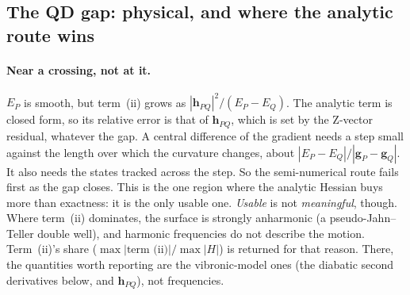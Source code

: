\documentclass[11pt]{article}
\begin{document}
\subsection{The QD gap: physical, and where the analytic route wins}

\paragraph{Near a crossing, not at it.} $E_P$ is smooth, but term~(ii)
grows as $|\mathbf h_{PQ}|^2/(E_P - E_Q)$. The analytic term is closed
form, so its relative error is that of $\mathbf h_{PQ}$, which is set by
the Z-vector residual, whatever the gap. A central difference of the
gradient needs a step small against the length over which the
curvature changes, about $|E_P - E_Q|/|\mathbf g_P - \mathbf g_Q|$. It
also needs the states tracked across the step. So the semi-numerical
route fails first as the gap closes. This is the one region where the
analytic Hessian buys more than exactness: it is the only usable one.
\emph{Usable} is not \emph{meaningful}, though. Where term~(ii) dominates,
the surface is strongly anharmonic (a pseudo-Jahn--Teller double well),
and harmonic frequencies do not describe the motion. Term~(ii)'s share
($\max|\text{term (ii)}|/\max|H|$) is returned for that reason. There, the
quantities worth reporting are the vibronic-model ones (the diabatic second
derivatives below, and $\mathbf h_{PQ}$), not frequencies.
\end{document}
